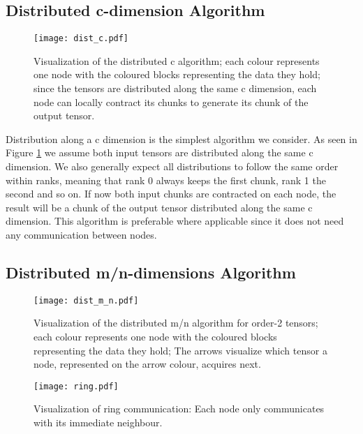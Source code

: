 \subsection{Distributed c-dimension Algorithm}

\begin{figure}[ht]
\centering\texttt{[image: dist\_c.pdf]} %
\caption{Visualization of the distributed c algorithm; 
each colour represents one node with the coloured blocks representing the data they hold; 
since the tensors are distributed along the same c dimension, each node can locally contract its chunks to generate its chunk of the output tensor.}
\label{fig:c_algo}
\end{figure}

Distribution along a c dimension is the simplest algorithm we consider. 
As seen in Figure \ref{fig:c_algo} we assume both input tensors are distributed along the same c dimension.
We also generally expect all distributions to follow the same order within ranks, meaning that rank 0 always keeps the first chunk, rank 1 the second and so on.
If now both input chunks are contracted on each node, the result will be a chunk of the output tensor distributed along the same c dimension.
This algorithm is preferable where applicable since it does not need any communication between nodes.

\subsection{Distributed m/n-dimensions Algorithm}

\begin{figure}[ht]
\centering\texttt{[image: dist\_m\_n.pdf]}
\caption{Visualization of the distributed m/n algorithm for order-2 tensors; 
each colour represents one node with the coloured blocks representing the data they hold;
The arrows visualize which tensor a node, represented on the arrow colour, acquires next.
}
\label{fig:m_n_algo}
\end{figure}

\begin{figure}[ht]
\centering\texttt{[image: ring.pdf]}
\caption{Visualization of ring communication: Each node only communicates with its immediate neighbour.}
\end{figure}


